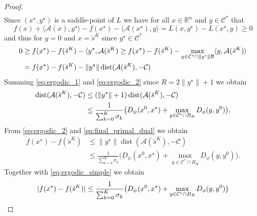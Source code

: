 \documentclass[10pt,a4paper]{amsart}
\newcommand{\bR}{\mathbb{R}}
\newcommand{\cB}{\mathcal{B}}
\newcommand{\cC}{\mathcal{C}}
\DeclareMathOperator{\dist}{dist}
\begin{document}
\begin{proof}
\begin{align}
\end{align}
Since $(x^\star,y^\star)$ is a saddle-point of $L$ we have for all $x \in \bR^n$ and $y \in \cC^*$ that
$$
f(x) + \langle \mathcal{A}(x), y^\star \rangle-f(x^\star) - \langle \mathcal{A}(x^\star), y\rangle= L(x, y^\star) - L(x^\star, y) \geq 0
$$
and thus for $y=0$ and $x=\breve s^K$ since $y^\star \in \cC^*$
\begin{align} 
0 &\geq f(x^\star)-f(\breve s^K) -\langle y^\star, \mathcal{A}(\breve s^K) \geq f(x^\star)-f(\breve s^K) - \max_{y \in \cC^*\cap \|y^\star\|\cB} \langle y, \mathcal{A}(\breve s^K)\rangle \notag \\
&= f(x^\star)-f(\breve s^K) - \|y^\star\|\dist(\mathcal{A}(\breve s^K),-\cC) \label{eq:ergodic_2}
\end{align}
Summing \cref{eq:ergodic_1} and \cref{eq:ergodic_2} since $R=2\|y^\star\|+1$ we obtain
\begin{align}
\dist(\mathcal{A}(\breve s^K),-\cC) &\leq (\|y^\star\| + 1)\dist(\mathcal{A}(\breve s^K),-\cC) \notag \\
&\leq \frac{1}{\sum_{k=0}^{K} \sigma_k} \big(D_\psi(x^0,x^\star) + \max_{y \in \cC^* \cap B_R} D_\phi(y, y^0)\big) \label{eq:final_primal_dual}.
\end{align}
From \cref{eq:ergodic_2} and \cref{eq:final_primal_dual} we obtain
\begin{align*}
    f(x^\star)-f(\breve s^K) &\leq \|y^\star\| \dist(\mathcal{A}(\breve s^K),-\cC) \\
    &\leq \frac{1}{\sum_{k=0}^{K} \sigma_k} \big(D_\psi(x^0,x^\star) + \max_{y \in \cC^* \cap B_R} D_\phi(y, y^0)\big).
\end{align*}
Together with \cref{eq:ergodic_simple} we obtain
\[
|f(x^\star)-f(\breve s^K)| \leq \frac{1}{\sum_{k=0}^{K} \sigma_k} \big(D_\psi(x^0,x^\star) + \max_{y \in \cC^* \cap B_R} D_\phi(y, y^0)\big) \qedhere
\]
\end{proof}
\end{document}
